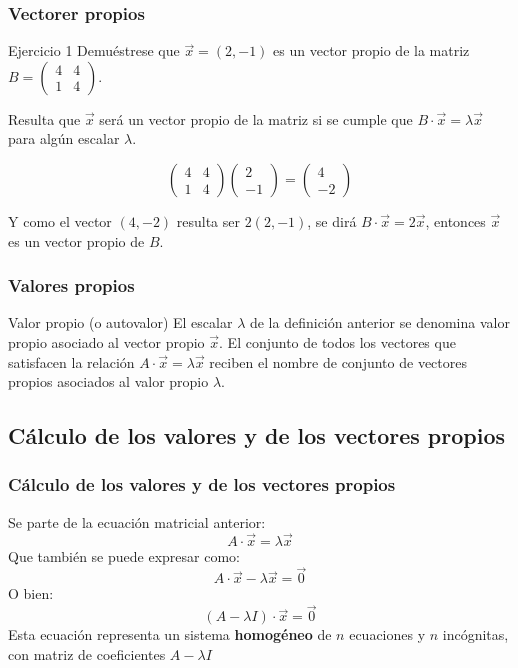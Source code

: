\documentclass{beamer}
\begin{document}
\begin{frame}
\frametitle{Vectorer propios}
\begin{block}{Ejercicio 1}
Demu\'estrese que $\vec x = (2,-1)$ es un vector propio de la matriz $B=\left(\begin{array}{rr}4 & 4 \\1 & 4\end{array}\right)$.
\end{block}
Resulta que $\vec x$ ser\'a un vector propio de la matriz si se cumple que $B\cdot \vec x = \lambda \vec x$ para alg\'un escalar $\lambda$.

\[\left(\begin{array}{rr}4 & 4 \\1 & 4\end{array}\right) \left(\begin{array}{r}2\\-1\end{array}\right) = \left(\begin{array}{r}4\\-2\end{array}\right)\]

Y como el vector $(4,-2)$ resulta ser $2(2,-1)$, se dir\'a $B\cdot \vec x = 2 \vec x$, entonces $\vec x$ es un vector propio de $B$.

\end{frame}



\begin{frame}
\frametitle{Valores propios}
\begin{block}{Valor propio (o autovalor)}
El escalar $\lambda$ de la definici\'on anterior se denomina valor propio asociado al vector propio $\vec x$. El conjunto de todos los vectores que satisfacen la relaci\'on $A\cdot \vec x = \lambda \vec x$ reciben el nombre de conjunto de vectores propios asociados al valor propio $\lambda$.
\end{block}
\end{frame}



\subsection{C\'alculo de los valores y de los vectores propios}
\begin{frame}
\frametitle{C\'alculo de los valores y de los vectores propios}
Se parte de la ecuaci\'on matricial anterior:
\[A\cdot \vec x = \lambda \vec x\]
Que tambi\'en se puede expresar como:
\[A\cdot \vec x - \lambda \vec x = \vec 0\]
O bien:
\[(A - \lambda I)\cdot \vec x = \vec 0\]
Esta ecuaci\'on representa un sistema \textbf{homog\'eneo} de $n$ ecuaciones y $n$ inc\'ognitas, con matriz de coeficientes $A-\lambda I$
\end{frame}
\end{document}

